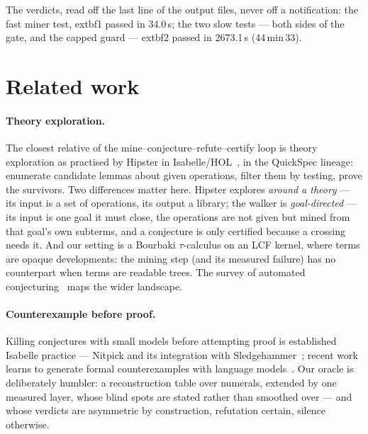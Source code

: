\documentclass[11pt]{article}
\theoremstyle{remark}\newtheorem{remark}{Remark}
\begin{document}
The verdicts, read off the last line of the output files, never off a
notification: the fast miner test, 	extbf{1 passed in 34.0\,s}; the two
slow tests --- both sides of the gate, and the capped guard ---
	extbf{2 passed in 2673.1\,s} (44\,min\,33).

\section{Related work}
\label{sec:related}

\paragraph{Theory exploration.} The closest relative of the
mine--conjecture--refute--certify loop is theory exploration as practised by
Hipster in Isabelle/HOL~\cite{johansson2014hipster}, in the QuickSpec lineage:
enumerate candidate lemmas about given operations, filter them by testing,
prove the survivors. Two differences matter here. Hipster explores
\emph{around a theory} --- its input is a set of operations, its output a
library; the walker is \emph{goal-directed} --- its input is one goal it must
close, the operations are not given but mined from that goal's own subterms,
and a conjecture is only certified because a crossing needs it. And our
setting is a Bourbaki $\tau$-calculus on an LCF kernel, where terms are
opaque developments: the mining step (and its measured failure) has no
counterpart when terms are readable trees. The survey of automated
conjecturing~\cite{conjecturingsurvey2026} maps the wider landscape.

\paragraph{Counterexample before proof.} Killing conjectures with small
models before attempting proof is established Isabelle practice ---
Nitpick and its integration with Sledgehammer~\cite{blanchette2011nitpick};
recent work learns to generate formal counterexamples with language
models~\cite{learningtodisprove2026}. Our oracle is deliberately humbler: a
reconstruction table over numerals, extended by one measured layer, whose
blind spots are stated rather than smoothed over --- and whose verdicts are
asymmetric by construction, refutation certain, silence otherwise.
\end{document}
